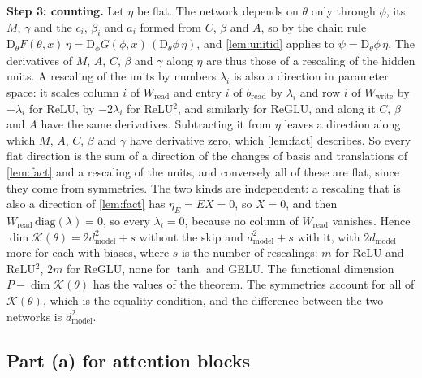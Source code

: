 \documentclass[10pt]{article}
\theoremstyle{definition}
\theoremstyle{remark}
\newcommand{\Wread}{W_{\mathrm{read}}}
\newcommand{\Wwrite}{W_{\mathrm{write}}}
\newcommand{\dm}{d_{\mathrm{model}}}
\newcommand{\Der}{\mathrm{D}}
\newcommand{\para}[1]{\smallskip\noindent\textbf{#1}\hspace{0.5em}}
\begin{document}
\para{Step 3: counting.} Let $\eta$ be flat. The network depends on $\theta$ only through $\phi$, its $M$, $\gamma$ and the $c_i$, $\beta_i$ and $a_i$ formed from $C$, $\beta$ and $A$, so by the chain rule $\Der_\theta F(\theta, x)\,\eta = \Der_\phi G(\phi, x)\,(\Der_\theta\phi\,\eta)$, and \cref{lem:unitid} applies to $\psi = \Der_\theta\phi\,\eta$. The derivatives of $M$, $A$, $C$, $\beta$ and $\gamma$ along $\eta$ are thus those of a rescaling of the hidden units. A rescaling of the units by numbers $\lambda_i$ is also a direction in parameter space: it scales column $i$ of $\Wread$ and entry $i$ of $b_{\mathrm{read}}$ by $\lambda_i$ and row $i$ of $\Wwrite$ by $-\lambda_i$ for ReLU, by $-2\lambda_i$ for ReLU$^2$, and similarly for ReGLU, and along it $C$, $\beta$ and $A$ have the same derivatives. Subtracting it from $\eta$ leaves a direction along which $M$, $A$, $C$, $\beta$ and $\gamma$ have derivative zero, which \cref{lem:fact} describes. So every flat direction is the sum of a direction of the changes of basis and translations of \cref{lem:fact} and a rescaling of the units, and conversely all of these are flat, since they come from symmetries. The two kinds are independent: a rescaling that is also a direction of \cref{lem:fact} has $\eta_E = EX = 0$, so $X = 0$, and then $\Wread\,\mathrm{diag}(\lambda) = 0$, so every $\lambda_i = 0$, because no column of $\Wread$ vanishes. Hence $\dim\mathcal K(\theta) = 2\dm^2 + s$ without the skip and $\dm^2 + s$ with it, with $2\dm$ more for each with biases, where $s$ is the number of rescalings: $m$ for ReLU and ReLU$^2$, $2m$ for ReGLU, none for $\tanh$ and GELU. The functional dimension $P - \dim\mathcal K(\theta)$ has the values of the theorem. The symmetries account for all of $\mathcal K(\theta)$, which is the equality condition, and the difference between the two networks is $\dm^2$.

\subsection*{Part (a) for attention blocks}
\end{document}
